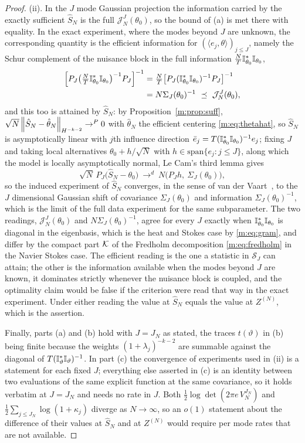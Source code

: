 \begin{proof}
(ii). In the $J$ mode Gaussian projection the information carried by the exactly sufficient $\hat S_N$ is the full $\mathcal J^J_N(\theta_0)$, so the bound of (a) is met there with equality. In the exact experiment, where the modes beyond $J$ are unknown, the corresponding quantity is the efficient information for $(\langle e_j,\theta\rangle)_{j\le J}$, namely the Schur complement of the nuisance block in the full information $\tfrac NT\mathbb{I}^*_{\theta_0}\mathbb{I}_{\theta_0}$,
\[
\begin{aligned}
\Big[P_J\big(\tfrac NT\mathbb{I}^*_{\theta_0}\mathbb{I}_{\theta_0}\big)^{-1}P_J\Big]^{-1}&=\tfrac NT\big[P_J(\mathbb{I}^*_{\theta_0}\mathbb{I}_{\theta_0})^{-1}P_J\big]^{-1}\\
&=N\Sigma_J(\theta_0)^{-1}\ \preceq\ \mathcal J^J_N(\theta_0) ,
\end{aligned}
\]
and this too is attained by $\hat S_N$: by Proposition~\ref{m:prop:suff}, $\sqrt N\left\|\hat S_N-\hat\theta_N\right\|_{H^{-k-2}}\to^P0$ with $\hat\theta_N$ the efficient centering \eqref{m:eq:thetahat}, so $\hat S_N$ is asymptotically linear with $j$th influence direction $\bar e_j=T(\mathbb{I}^*_{\theta_0}\mathbb{I}_{\theta_0})^{-1}e_j$; fixing $J$ and taking local alternatives $\theta_0+h/\sqrt N$ with $h\in\mathrm{span}\{e_j:j\le J\}$, along which the model is locally asymptotically normal, Le Cam's third lemma gives
\[
\sqrt N\,P_J\big(\hat S_N-\theta_0\big)\ \to^d\ N\big(P_Jh,\ \Sigma_J(\theta_0)\big) ,
\]
so the induced experiment of $\hat S_N$ converges, in the sense of van der Vaart~\cite[Chapter 9]{vandervaart1998}, to the $J$ dimensional Gaussian shift of covariance $\Sigma_J(\theta_0)$ and information $\Sigma_J(\theta_0)^{-1}$, which is the limit of the full data experiment for the same subparameter. The two readings, $\mathcal J^J_N(\theta_0)$ and $N\Sigma_J(\theta_0)^{-1}$, agree for every $J$ exactly when $\mathbb{I}^*_{\theta_0}\mathbb{I}_{\theta_0}$ is diagonal in the eigenbasis, which is the heat and Stokes case by \eqref{m:eq:gram}, and differ by the compact part $\mathcal{K}$ of the Fredholm decomposition \eqref{m:eq:fredholm} in the Navier Stokes case. The efficient reading is the one a statistic in $\mathcal S_J$ can attain; the other is the information available when the modes beyond $J$ are known, it dominates strictly whenever the nuisance block is coupled, and the optimality claim would be false if the criterion were read that way in the exact experiment. Under either reading the value at $\hat S_N$ equals the value at $Z^{(N)}$, which is the assertion.

Finally, parts (a) and (b) hold with $J=J_N$ as stated, the traces $t(\vartheta)$ in (b) being finite because the weights $(1+\lambda_j)^{-k-2}$ are summable against the diagonal of $T(\mathbb{I}^*_\vartheta\mathbb{I}_\vartheta)^{-1}$. In part (c) the convergence of experiments used in (ii) is a statement for each fixed $J$; everything else asserted in (c) is an identity between two evaluations of the same explicit function at the same covariance, so it holds verbatim at $J=J_N$ and needs no rate in $J$. Both $\tfrac12\log\det(2\pi e\,V^{J_N}_N)$ and $\tfrac12\sum_{j\le J_N}\log(1+\kappa_j)$ diverge as $N\to\infty$, so an $o(1)$ statement about the difference of their values at $\hat S_N$ and at $Z^{(N)}$ would require per mode rates that are not available.
\end{proof}

